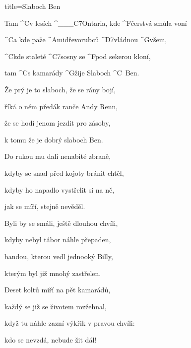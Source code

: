 \begin{song}{title=\predtitle\centering Slaboch Ben \\\large  \vspace*{-0.3cm}}  %
\begin{centerjustified}

\sloka
	Tam ^{C}v lesích ^{{\color{white}\_\_\_}C7}Ontaria, kde ^{F\z}čerstvá smůla voní

	^{C}a kde paže ^{Ami\z}dřevorubců ^{D7\z}vládnou ^{G\z}všem,
	
	^{C\z}kde staleté ^{C7\z}sosny se ^{F\z}pod sekerou kloní,
	
	tam ^{C}s kamarády ^{G\z}žije Slaboch ^{C\,\,\,}Ben.
	
	
\sloka
	Že prý je to slaboch, že se rány bojí,
	
	říká o něm předák ranče Andy Renn,
	
	že se hodí jenom jezdit pro zásoby,
	
	k tomu že je dobrý slaboch Ben.
	
	
\sloka
	Do rukou mu dali nenabité zbraně,
	
	kdyby se snad před kojoty bránit chtěl,
	
	kdyby ho napadlo vystřelit si na ně,
	
	jak se míří, stejně nevěděl.

	
\sloka	
	Byli by se smáli, ještě dlouhou chvíli,
	
	kdyby nebyl tábor náhle přepaden,
	
	bandou, kterou vedl jednooký Billy,
	
	kterým byl již mnohý zastřelen.
	
	

	


\sloka
	Deset koltů miří na pět kamarádů,
	
	každý se již se životem rozžehnal,
	
	když tu náhle zazní výkřik v pravou chvíli:
	
	kdo se nevzdá, nebude žit dál!
	

\end{centerjustified}
\end{song}
